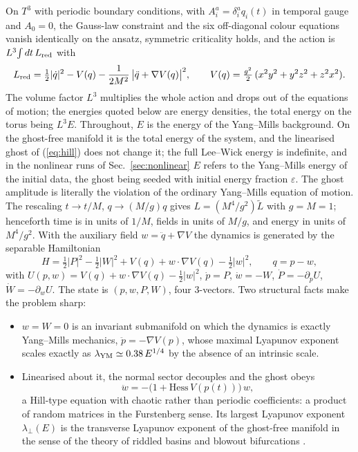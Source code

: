 \documentclass[11pt,a4paper]{article}
\newcommand{\Hess}{\mathrm{Hess}\,}
\newcommand{\YM}{{\rm YM}}
\begin{document}
On $T^3$ with periodic boundary conditions, with $A^a_i=\delta^a_i q_i(t)$ in temporal gauge and
$A_0=0$, the Gauss-law constraint and the six off-diagonal colour equations vanish identically on
the ansatz, symmetric criticality holds, and the action is $L^3\!\int dt\,L_{\rm red}$ with
\cite{note:derive}
\begin{equation}
L_{\rm red}=\tfrac12|\dot q|^2-V(q)-\frac1{2M^2}\,\big|\ddot q+\nabla V(q)\big|^2,\qquad
V(q)=\tfrac{g^2}2\,(x^2y^2+y^2z^2+z^2x^2).
\label{eq:Lred}
\end{equation}
The volume factor $L^3$ multiplies the whole action and drops out of the equations of motion; the
energies quoted below are energy densities, the total energy on the torus being $L^3E$.
Throughout, $E$ is the energy of the Yang--Mills background. On the ghost-free manifold it is
the total energy of the system, and the linearised ghost of (\ref{eq:hill}) does not change it;
the full Lee--Wick energy is indefinite, and in the nonlinear runs of Sec.~\ref{sec:nonlinear}
$E$ refers to the Yang--Mills energy of the initial data, the ghost being seeded with initial energy
fraction $\varepsilon$. The ghost
amplitude is literally the violation of the ordinary Yang--Mills equation of motion.
The rescaling $t\to t/M$, $q\to(M/g)q$ gives $L=(M^4/g^2)\tilde L$ with $g=M=1$; henceforth time
is in units of $1/M$, fields in units of $M/g$, and energy in units of $M^4/g^2$. With the
auxiliary field $w=\ddot q+\nabla V$ the dynamics is generated by the separable Hamiltonian
\begin{equation}
H=\tfrac12|P|^2-\tfrac12|W|^2+V(q)+w\cdot\nabla V(q)-\tfrac12|w|^2,\qquad q=p-w,
\label{eq:H}
\end{equation}
with $U(p,w)=V(q)+w\cdot\nabla V(q)-\tfrac12|w|^2$, $\dot p=P$, $\dot w=-W$, $\dot P=-\partial_pU$,
$\dot W=-\partial_wU$. The state is
$(p,w,P,W)$, four 3-vectors. Two structural facts make the problem sharp:
\begin{itemize}
\item $w=W=0$ is an invariant submanifold on which the dynamics is exactly Yang--Mills mechanics,
$\ddot p=-\nabla V(p)$, whose maximal Lyapunov exponent scales exactly as
$\lambda_\YM\simeq0.38\,E^{1/4}$ by the absence of an intrinsic scale.
\item Linearised about it, the normal sector decouples and the ghost obeys
\begin{equation}
\ddot w=-\big(1+\Hess V(p(t))\big)\,w ,
\label{eq:hill}
\end{equation}
a Hill-type equation with chaotic rather than periodic coefficients: a product of random
matrices in the Furstenberg sense. Its largest Lyapunov exponent $\lambda_\perp(E)$ is the
transverse Lyapunov exponent of the ghost-free manifold in the sense of the theory of riddled
basins and blowout bifurcations \cite{OttSommerer,ABS96}.
\end{itemize}
\end{document}
